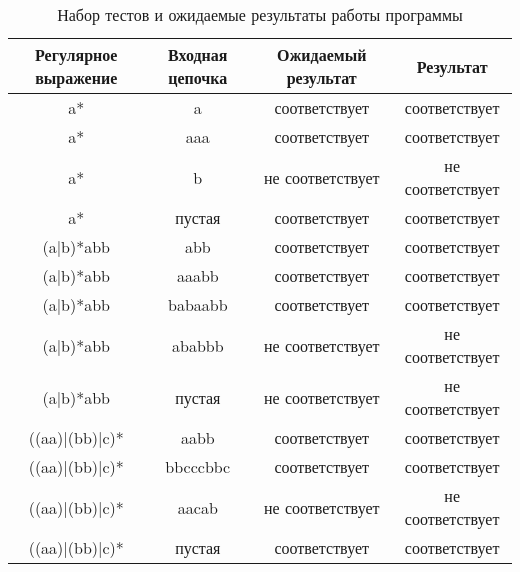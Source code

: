 \documentclass{bmstu}
\begin{document}
\begin{table}[H]
    \centering
	\caption{Набор тестов и ожидаемые результаты работы программы}
    \label{tbl:tests}
	\begin{tabular}{|c|c|c|c|}
        \hline
        \begin{minipage}[t]{4cm}\centering \textbf{Регулярное выражение}\end{minipage} &
        \begin{minipage}[t]{4cm}\centering \textbf{Входная цепочка}\end{minipage} &
        \begin{minipage}[t]{4cm}\centering \textbf{Ожидаемый результат}\end{minipage} &
        \begin{minipage}[t]{4cm}\centering \textbf{Результат}\end{minipage} \\ \hline
        a* & a & соответствует & соответствует \\ \hline
        a* & aaa & соответствует & соответствует \\ \hline
        a* & b & не соответствует & не соответствует \\ \hline
        a* & пустая & соответствует & соответствует \\ \hline

        (a|b)*abb & abb & соответствует & соответствует \\ \hline
        (a|b)*abb & aaabb & соответствует & соответствует \\ \hline
        (a|b)*abb & babaabb & соответствует & соответствует \\ \hline
        (a|b)*abb & ababbb & не соответствует & не соответствует \\ \hline
        (a|b)*abb & пустая & не соответствует & не соответствует \\ \hline
        
        ((aa)|(bb)|c)* & aabb & соответствует & соответствует \\ \hline
        ((aa)|(bb)|c)* & bbcccbbc & соответствует & соответствует \\ \hline
        ((aa)|(bb)|c)* & aacab & не соответствует & не соответствует \\ \hline
        ((aa)|(bb)|c)* & пустая & соответствует & соответствует \\ \hline
    \end{tabular}
\end{table}
\end{document}
